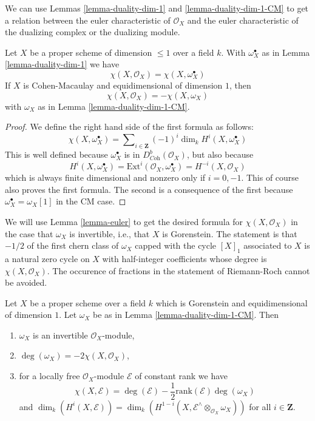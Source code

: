 \noindent
We can use Lemmas \ref{lemma-duality-dim-1} and \ref{lemma-duality-dim-1-CM}
to get a relation between the euler
characteristic of $\mathcal{O}_X$ and the euler characteristic
of the dualizing complex or the dualizing module.

\begin{lemma}
\label{lemma-euler}
Let $X$ be a proper scheme of dimension $\leq 1$ over a field $k$.
With $\omega_X^\bullet$ as in Lemma \ref{lemma-duality-dim-1} we have
$$
\chi(X, \mathcal{O}_X) = \chi(X, \omega_X^\bullet)
$$
If $X$ is Cohen-Macaulay and equidimensional of dimension $1$, then
$$
\chi(X, \mathcal{O}_X) = - \chi(X, \omega_X)
$$
with $\omega_X$ as in Lemma \ref{lemma-duality-dim-1-CM}.
\end{lemma}

\begin{proof}
We define the right hand side of the first formula as follows:
$$
\chi(X, \omega_X^\bullet) =
\sum\nolimits_{i \in \mathbf{Z}} (-1)^i\dim_k H^i(X, \omega_X^\bullet)
$$
This is well defined because $\omega_X^\bullet$ is in
$D^b_{\textit{Coh}}(\mathcal{O}_X)$, but also because
$$
H^i(X, \omega_X^\bullet) =
\text{Ext}^i(\mathcal{O}_X, \omega_X^\bullet) =
H^{-i}(X, \mathcal{O}_X)
$$
which is always finite dimensional and nonzero only if $i = 0, -1$.
This of course also proves the first formula. The second is a consequence
of the first because $\omega_X^\bullet = \omega_X[1]$ in the CM case.
\end{proof}

\noindent
We will use Lemma \ref{lemma-euler} to get the desired formula for
$\chi(X, \mathcal{O}_X)$ in the case that $\omega_X$ is
invertible, i.e., that $X$ is Gorenstein.
The statement is that $-1/2$ of the first chern class of $\omega_X$
capped with the cycle $[X]_1$ associated to $X$ is a natural zero
cycle on $X$ with half-integer coefficients whose degree is
$\chi(X, \mathcal{O}_X)$.
The occurence of fractions in the statement of Riemann-Roch cannot
be avoided.

\begin{lemma}
\label{lemma-rr}
Let $X$ be a proper scheme over a field $k$ which is Gorenstein and
equidimensional of dimension $1$. Let $\omega_X$ be as in
Lemma \ref{lemma-duality-dim-1-CM}. Then
\begin{enumerate}
\item $\omega_X$ is an invertible $\mathcal{O}_X$-module,
\item $\deg(\omega_X) = -2\chi(X, \mathcal{O}_X)$,
\item for a locally free $\mathcal{O}_X$-module $\mathcal{E}$
of constant rank we have
$$
\chi(X, \mathcal{E}) = \deg(\mathcal{E}) -
\textstyle{\frac{1}{2}} \text{rank}(\mathcal{E}) \deg(\omega_X)
$$
and $\dim_k(H^i(X, \mathcal{E})) =
\dim_k(H^{1 - i}(X, \mathcal{E}^\wedge \otimes_{\mathcal{O}_X} \omega_X))$
for all $i \in \mathbf{Z}$.
\end{enumerate}
\end{lemma}

